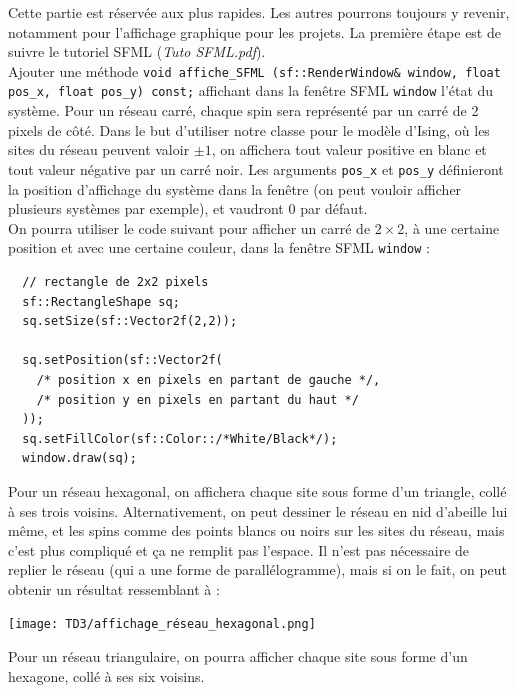 \documentclass{book}
\newcommand{\inline}[1]{\texttt{#1}}
\def\filename{\emph}
\begin{document}
Cette partie est réservée aux plus rapides. Les autres pourrons toujours y revenir, notamment pour l'affichage graphique pour les projets. La première étape est de suivre le tutoriel SFML (\filename{Tuto SFML.pdf}).\\ 

Ajouter une méthode \inline{void affiche_SFML (sf::RenderWindow& window, float pos_x, float pos_y) const;} affichant dans la fenêtre SFML \inline{window} l'état du système. Pour un réseau carré, chaque spin sera représenté par un carré de 2 pixels de côté. Dans le but d'utiliser notre classe pour le modèle d'Ising, où les sites du réseau peuvent valoir $\pm 1$, on affichera tout valeur positive en blanc et tout valeur négative par un carré noir. Les arguments \inline{pos_x} et \inline{pos_y} définieront la position d'affichage du système dans la fenêtre (on peut vouloir afficher plusieurs systèmes par exemple), et vaudront 0 par défaut.\\

On pourra utiliser le code suivant pour afficher un carré de $2 \times 2$, à une certaine position et avec une certaine couleur, dans la fenêtre SFML \inline{window} :
\begin{verbatim}
  // rectangle de 2x2 pixels
  sf::RectangleShape sq;
  sq.setSize(sf::Vector2f(2,2));

  sq.setPosition(sf::Vector2f(
    /* position x en pixels en partant de gauche */,
    /* position y en pixels en partant du haut */
  ));
  sq.setFillColor(sf::Color::/*White/Black*/);
  window.draw(sq);
\end{verbatim}

Pour un réseau hexagonal, on affichera chaque site sous forme d'un triangle, collé à ses trois voisins. Alternativement, on peut dessiner le réseau en nid d'abeille lui même, et les spins comme des points blancs ou noirs sur les sites du réseau, mais c'est plus compliqué et ça ne remplit pas l'espace. Il n'est pas nécessaire de replier le réseau (qui a une forme de parallélogramme), mais si on le fait, on peut obtenir un résultat ressemblant à :
\begin{center}
\texttt{[image: TD3/affichage\_réseau\_hexagonal.png]}
\end{center}
Pour un réseau triangulaire, on pourra afficher chaque site sous forme d'un hexagone, collé à ses six voisins.
\end{document}
